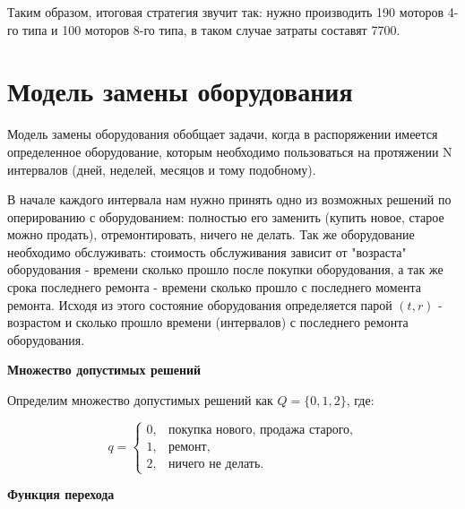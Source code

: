 Таким образом, итоговая стратегия звучит так: нужно производить 190 моторов 4-го типа и 100 моторов 8-го типа, в таком случае затраты составят 7700.

\section{Модель замены оборудования}\label{pr:equipment_replacement_model}

Модель замены оборудования обобщает задачи, когда в распоряжении имеется определенное оборудование, которым необходимо пользоваться на протяжении N интервалов (дней, неделей, месяцов и тому подобному).

\begin{figure}[H]
	\centering
{}
\end{figure}

В начале каждого интервала нам нужно принять одно из возможных решений по оперированию с оборудованием: полностью его заменить (купить новое, старое можно продать), отремонтировать, ничего не делать. Так же оборудование необходимо обслуживать: стоимость обслуживания зависит от "возраста" оборудования - времени сколько прошло после покупки оборудования, а так же срока последнего ремонта - времени сколько прошло с последнего момента ремонта.
Исходя из этого состояние оборудования определяется парой $(t,r)$ - возрастом и сколько прошло времени (интервалов) с последнего ремонта оборудования.

\bigskip

\textbf{Множество допустимых решений}

Определим множество допустимых решений как $Q = \{0, 1, 2\}$, где:

\[
q = 
\begin{cases}
	0, & \text{покупка нового, продажа старого}, \\
	1, & \text{ремонт}, \\
	2, & \text{ничего не делать}.
\end{cases}
\]

\bigskip

\textbf{Функция перехода}

